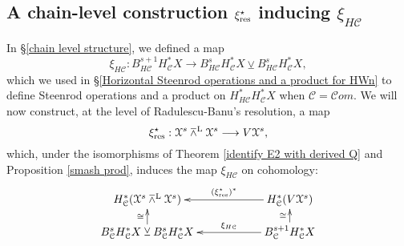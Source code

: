 \documentclass[11pt]{amsart} \renewcommand{\baselinestretch}{1.4}
\theoremstyle{plain}
\theoremstyle{definition}
\renewcommand{\to}{\longrightarrow}
\newcommand{\from}{\longleftarrow}
\newcommand{\scrC}{\mathscr{C}}
\newcommand{\calx}{\mathcal{X}}
\newcommand{\calc}{\mathcal{C}}
\newcommand{\HA}[1]{H#1}
\newcommand{\algs}{{\scrC\!\textit{om}}}
\newcommand{\Lsmashprod}{\barwedge^\mathrm{L}}%
\newcommand{\smashcoprod}{\veebar}%
\begin{document}
\begin{Operations on the Bousfield-Kan spectral sequence}
\subsection{A chain-level construction $\xi_\textup{res}^\star$ inducing $\xi_{\HA{\calc}}$}\label{sec xires}
In \S\ref{chain level structure}, we defined a map
\[\xi_{\HA{\calc}}:B^{s+1}_{\HA{\calc}}H^*_{\calc}X\to B^{s}_{\HA{\calc}}H^*_{\calc}X\smashcoprod B^{s}_{\HA{\calc}}H^*_{\calc}X,\]
which we used in \S\ref{Horizontal Steenrod operations and a product for HWn} to define Steenrod operations and a product on $H^{*}_{\HA{\calc}}H^*_{\calc}X$ when $\calc=\algs$. 
We will now construct, at the level of Radulescu-Banu's resolution, a map
\[\xi_\textup{res}^\star:\calx^s\Lsmashprod \calx^s\to V\calx^s,\]
which, under the isomorphisms of Theorem \ref{identify E2 with derived Q} and Proposition \ref{smash prod}, induces the map $\xi_{\HA{\calc}}$ on cohomology:
\[\xymatrix@R=4mm@C=20mm{
H^*_{\calc}(\calx^s\Lsmashprod \calx^s)&\ar[l]_-{(\xi_\textup{res}^\star)^*}
H^*_{\calc}(V\calx^s)\\%
B^{s}_\calc H^*_\calc X\smashcoprod B^{s}_\calc H^*_\calc X\ar[u]^-{\cong}&%
B^{s+1}_\calc H^*_\calc X\ar[l]_-{\xi_{\HA{\calc}}}\ar[u]^-{\cong}%
}\]



\end{Operations on the Bousfield-Kan spectral sequence}
\end{document}
